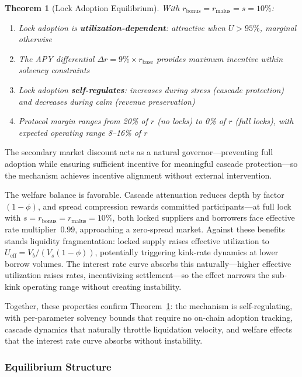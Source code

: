 \documentclass[10pt,a4paper,twocolumn]{article}
\theoremstyle{definition}
\theoremstyle{plain}
\newtheorem{theorem}{Theorem}[section]
\theoremstyle{remark}
\begin{document}
\begin{theorem}[Lock Adoption Equilibrium]
\label{thm:nash}
With $r_{\text{bonus}} = r_{\text{malus}} = s = 10\%$:
\begin{enumerate}
    \item Lock adoption is \textbf{utilization-dependent}: attractive when $U > 95\%$, marginal otherwise
    \item The APY differential $\Delta r = 9\% \times r_{\text{base}}$ provides maximum incentive within solvency constraints
    \item Lock adoption \textbf{self-regulates}: increases during stress (cascade protection) and decreases during calm (revenue preservation)
    \item Protocol margin ranges from 20\% of $r$ (no locks) to 0\% of $r$ (full locks), with expected operating range 8--16\% of $r$
\end{enumerate}
\end{theorem}

The secondary market discount acts as a natural governor---preventing full adoption while ensuring sufficient incentive for meaningful cascade protection---so the mechanism achieves incentive alignment without external intervention.

The welfare balance is favorable. Cascade attenuation reduces depth by factor~$(1{-}\phi)$, and spread compression rewards committed participants---at full lock with $s = r_{\text{bonus}} = r_{\text{malus}} = 10\%$, both locked suppliers and borrowers face effective rate multiplier~$0.99$, approaching a zero-spread market. Against these benefits stands liquidity fragmentation: locked supply raises effective utilization to $U_{\text{eff}} = V_b / (V_s(1{-}\phi))$, potentially triggering kink-rate dynamics at lower borrow volumes. The interest rate curve absorbs this naturally---higher effective utilization raises rates, incentivizing settlement---so the effect narrows the sub-kink operating range without creating instability.

Together, these properties confirm Theorem~\ref{thm:nash}: the mechanism is self-regulating, with per-parameter solvency bounds that require no on-chain adoption tracking, cascade dynamics that naturally throttle liquidation velocity, and welfare effects that the interest rate curve absorbs without instability.

\subsubsection{Equilibrium Structure}
\end{document}
